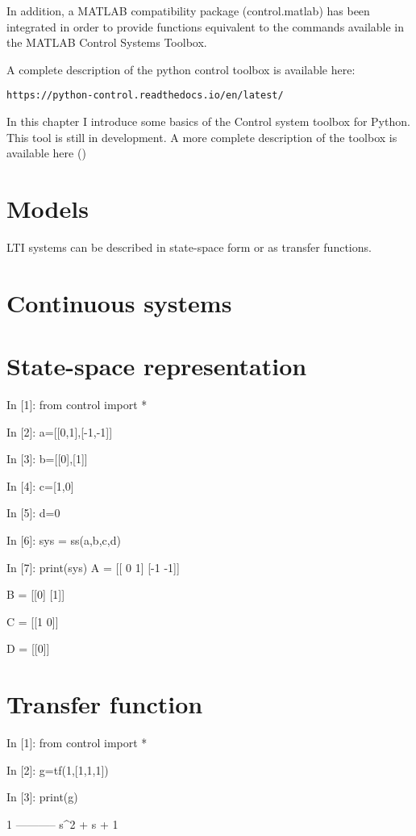 In addition, a MATLAB compatibility package (control.matlab) has been integrated in order to provide functions equivalent to the commands available in the MATLAB Control Systems Toolbox.

A complete description of the python control toolbox is available here:

\begin{verbatim}
https://python-control.readthedocs.io/en/latest/
\end{verbatim}

In this chapter I introduce some basics of the Control system toolbox for Python. This tool is still in development. A more complete description of the toolbox is available here (\cite{MANUALTBX})

\section{Models}

LTI systems can be described in state-space form or as transfer functions.

\section{Continuous systems}
\section{State-space representation}
\begin{code}
In [1]: from control import *

In [2]: a=[[0,1],[-1,-1]]

In [3]: b=[[0],[1]]

In [4]: c=[1,0]

In [5]: d=0

In [6]: sys = ss(a,b,c,d)

In [7]: print(sys)
A = [[ 0  1]
 [-1 -1]]

B = [[0]
 [1]]

C = [[1 0]]

D = [[0]]
\end{code}

 
\section{Transfer function}

\begin{code}
 In [1]: from control import *

In [2]: g=tf(1,[1,1,1])

In [3]: print(g)

     1
-----------
s^2 + s + 1
\end{code}


